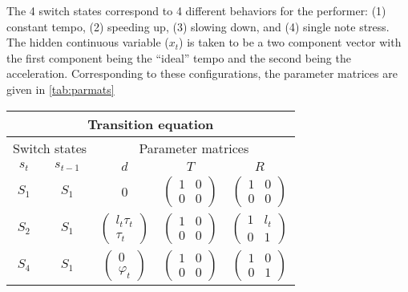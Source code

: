 \documentclass[12pt]{article}
\begin{document}
The 4 switch states correspond to 4 different behaviors for the
performer: (1) constant tempo, (2) speeding up, (3) slowing down, and
(4) single note stress. The hidden continuous variable ($x_t$) is
taken to be a two component vector with the first component being the
``ideal'' tempo and the second being the acceleration. 
Corresponding to these configurations, the parameter
matrices are given in \autoref{tab:parmats}

\begin{table}[h!]
\centering
\begin{tabular}[h!]{cc|ccc}
  \hline\hline
  \multicolumn{5}{c}{Transition equation}\\
  \hline
  \multicolumn{2}{c|}{Switch states} & \multicolumn{3}{c}{Parameter
                                      matrices}\\
  $s_{t}$ & $s_{t-1}$ & $d$ & $T$ & $R$ \\
  \hline
  $S_1$ &  $S_1$ & 0 & $\begin{pmatrix}1&0\\0&0\end{pmatrix}$ 
                 & $\begin{pmatrix}1&0\\0&0\end{pmatrix}$\\
  $S_2$ & $S_1$ & $\begin{pmatrix} l_t\tau_t\\ \tau_t\end{pmatrix}$ 
                                    & $\begin{pmatrix} 1 & 0 \\ 0 &
                                      0 \end{pmatrix}$ 
          & $\begin{pmatrix} 1 & l_t\\ 0 & 1 \end{pmatrix}$\\
  $S_4$ & $S_1$ & $\begin{pmatrix}0\\\varphi_t\end{pmatrix}$ 
                                     & $\begin{pmatrix}1&0\\0&0\end{pmatrix}$
          & $\begin{pmatrix}1&0\\0&1\end{pmatrix}$\\

\end{tabular}
\end{table}
\end{document}
